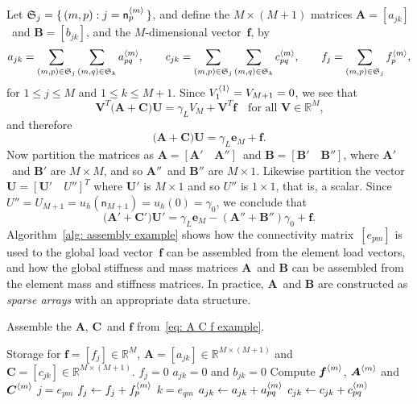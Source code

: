 Let $\mathfrak{S}_j=\{\,(m,p):j=\mathsf{n}^{\langle m\rangle}_p\,\}$, and
define the $M\times(M+1)$ matrices $\boldsymbol{A}=[a_{jk}]$~and 
$\boldsymbol{B}=[b_{jk}]$, and the $M$-dimensional vector~$\boldsymbol{f}$, by
\[
a_{jk}=\sum_{(m,p)\in\mathfrak{S}_j}
    \sum_{(m,q)\in\mathfrak{S}_k}a^{\langle m\rangle}_{pq},\qquad
c_{jk}=\sum_{(m,p)\in\mathfrak{S}_j}
    \sum_{(m,q)\in\mathfrak{S}_k}c^{\langle m\rangle}_{pq},\qquad
f_j=\sum_{(m,p)\in\mathfrak{S}_j}f^{\langle m\rangle}_p,
\]
for $1\le j\le M$ and $1\le k\le M+1$.  Since $V^{\langle1\rangle}_1=V_{M+1}=0$, we see
that
\[
\boldsymbol{V}^T\bigl(\boldsymbol{A}+\boldsymbol{C}\bigr)\boldsymbol{U}
    =\gamma_LV_M+\boldsymbol{V}^T\boldsymbol{f}
    \quad\text{for all $\boldsymbol{V}\in\mathbb{R}^M$,}
\]
and therefore
\begin{equation}\label{eq: A C f example}
\bigl(\boldsymbol{A}+\boldsymbol{C}\bigr)\boldsymbol{U}
    =\gamma_L\boldsymbol{e}_M+\boldsymbol{f}.
\end{equation}
Now partition the matrices as 
$\boldsymbol{A}=[\boldsymbol{A}'\quad\boldsymbol{A}'']$~and
$\boldsymbol{B}=[\boldsymbol{B}'\quad\boldsymbol{B}'']$, where 
$\boldsymbol{A}'$~and $\boldsymbol{B}'$ are $M\times M$, and so
$\boldsymbol{A}''$~and $\boldsymbol{B}''$ are $M\times1$.  Likewise partition 
the vector~$\boldsymbol{U}=[\boldsymbol{U}'\quad U'']^T$ where 
$\boldsymbol{U}'$ is $M\times1$ and so $U''$ is $1\times1$, that is, a scalar.  
Since $U''=U_{M+1}=u_h(\mathsf{n}_{M+1})=u_h(0)=\gamma_0$, we conclude that
\[
\bigl(\boldsymbol{A}'+\boldsymbol{C}'\bigr)\boldsymbol{U}'
=\gamma_L\boldsymbol{e}_M-(\boldsymbol{A}''+\boldsymbol{B}'')\gamma_0
    +\boldsymbol{f}.
\]
Algorithm~\ref{alg: assembly example} shows how the connectivity 
matrix~$[e_{pm}]$ is used to the global load 
vector~$\boldsymbol{f}$ can be assembled from the element load vectors, and 
how the global stiffness and mass matrices $\boldsymbol{A}$~and $\boldsymbol{B}$ 
can be assembled from the element mass and stiffness matrices.  In practice,
$\boldsymbol{A}$~and $\boldsymbol{B}$ are constructed as \emph{sparse arrays}
with an appropriate data structure.

\begin{algorithm}
\caption{Assemble the $\boldsymbol{A}$, $\boldsymbol{C}$~and $\boldsymbol{f}$
from~\eqref{eq: A C f example}.}
\label{alg: assembly example}
\begin{algorithmic}
\State Storage for $\boldsymbol{f}=[f_j]\in\mathbb{R}^M$,
$\boldsymbol{A}=[a_{jk}]\in\mathbb{R}^{M\times(M+1)}$ and
$\boldsymbol{C}=[c_{jk}]\in\mathbb{R}^{M\times(M+1)}$.
    \State $f_j=0$
        \State $a_{jk}=0$ and $b_{jk}=0$
    \EndFor
\EndFor
{}
    \State Compute $\boldsymbol{f}^{\langle m\rangle}$, $\boldsymbol{A}^{\langle m\rangle}$ and
           $\boldsymbol{C}^{\langle m\rangle}$
        \State $j=e_{pm}$
            \State $f_j\gets f_j+f^{\langle m\rangle}_p$
        \EndIf
            \State $k=e_{qm}$
            \State $a_{jk}\gets a_{jk}+a^{\langle m\rangle}_{pq}$
            \State $c_{jk}\gets c_{jk}+c^{\langle m\rangle}_{pq}$
        \EndFor
    \EndFor
\EndFor
\end{algorithmic}
\end{algorithm}

